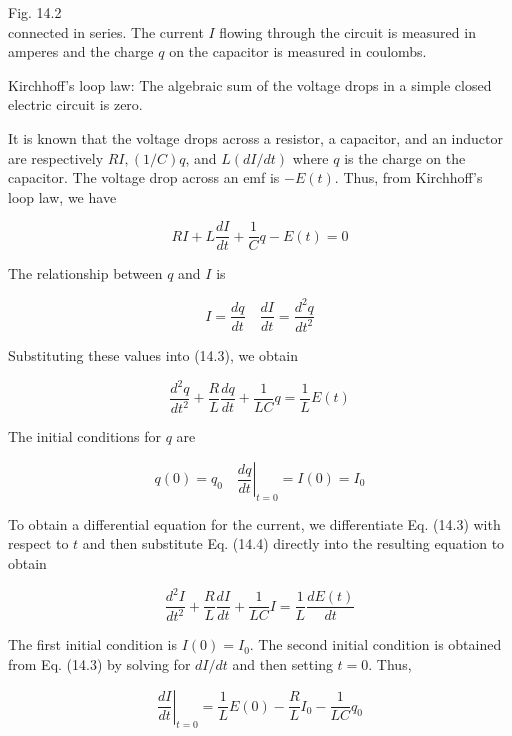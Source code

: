 \documentclass[10pt]{article}
\begin{document}
Fig. 14.2\\
connected in series. The current $I$ flowing through the circuit is measured in amperes and the charge $q$ on the capacitor is measured in coulombs.

Kirchhoff's loop law: The algebraic sum of the voltage drops in a simple closed electric circuit is zero.

It is known that the voltage drops across a resistor, a capacitor, and an inductor are respectively $R I,(1 / C) q$, and $L(d I / d t)$ where $q$ is the charge on the capacitor. The voltage drop across an emf is $-E(t)$. Thus, from Kirchhoff's loop law, we have


\begin{equation*}
R I+L \frac{d I}{d t}+\frac{1}{C} q-E(t)=0 \tag{14.3}
\end{equation*}


The relationship between $q$ and $I$ is


\begin{equation*}
I=\frac{d q}{d t} \quad \frac{d I}{d t}=\frac{d^{2} q}{d t^{2}} \tag{14.4}
\end{equation*}


Substituting these values into (14.3), we obtain


\begin{equation*}
\frac{d^{2} q}{d t^{2}}+\frac{R}{L} \frac{d q}{d t}+\frac{1}{L C} q=\frac{1}{L} E(t) \tag{14.5}
\end{equation*}


The initial conditions for $q$ are


\begin{equation*}
q(0)=\left.q_{0} \quad \frac{d q}{d t}\right|_{t=0}=I(0)=I_{0} \tag{14.6}
\end{equation*}


To obtain a differential equation for the current, we differentiate Eq. (14.3) with respect to $t$ and then substitute Eq. (14.4) directly into the resulting equation to obtain


\begin{equation*}
\frac{d^{2} I}{d t^{2}}+\frac{R}{L} \frac{d I}{d t}+\frac{1}{L C} I=\frac{1}{L} \frac{d E(t)}{d t} \tag{14.7}
\end{equation*}


The first initial condition is $I(0)=I_{0}$. The second initial condition is obtained from Eq. (14.3) by solving for $d I / d t$ and then setting $t=0$. Thus,


\begin{equation*}
\left.\frac{d I}{d t}\right|_{t=0}=\frac{1}{L} E(0)-\frac{R}{L} I_{0}-\frac{1}{L C} q_{0} \tag{14.8}
\end{equation*}
\end{document}
